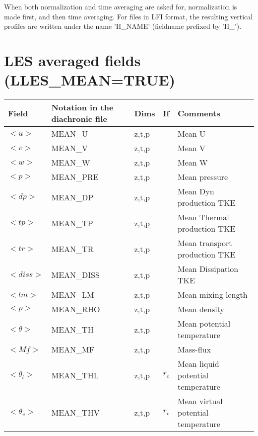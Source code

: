 When both normalization and time averaging are asked for,
normalization is made first, and then time averaging. For files in LFI format, the resulting
vertical profiles are written under the name 'H\_NAME' (fieldname prefixed by 'H\_').



\section{LES averaged fields (LLES\_MEAN=TRUE)}

\begin{longtable}[c]{|p{}|p{}|p{}|p{}|p{}|}
\hline
Field & Notation in the diachronic file & Dims & If  & Comments \\
\hline \hline
\endhead
$<u>$               & MEAN\_U      & z,t,p   &       & Mean U \\\hline
$<v>$               & MEAN\_V      & z,t,p   &       & Mean V \\\hline
$<w>$               & MEAN\_W      & z,t,p   &       & Mean W \\\hline
$<p>$               & MEAN\_PRE    & z,t,p   &       & Mean pressure \\\hline
$<dp>$              & MEAN\_DP     & z,t,p   &       & Mean Dyn production TKE \\\hline
$<tp>$              & MEAN\_TP     & z,t,p   &       & Mean Thermal production TKE \\\hline
$<tr>$              & MEAN\_TR     & z,t,p   &       & Mean transport production TKE \\\hline
$<diss>$            & MEAN\_DISS   & z,t,p   &       & Mean Dissipation TKE \\\hline
$<lm>$              & MEAN\_LM     & z,t,p   &       & Mean mixing length \\\hline
$<\rho>$            & MEAN\_RHO    & z,t,p   &       & Mean density \\\hline
$<\theta>$          & MEAN\_TH     & z,t,p   &       & Mean potential temperature\\\hline
$<Mf>$              & MEAN\_MF     & z,t,p   &       & Mass-flux \\\hline
$<\theta_l>$        & MEAN\_THL    & z,t,p   & $r_c$ & Mean liquid potential temperature \\\hline
$<\theta_v>$        & MEAN\_THV    & z,t,p   & $r_v$ & Mean virtual potential temperature \\\hline

\end{longtable}
